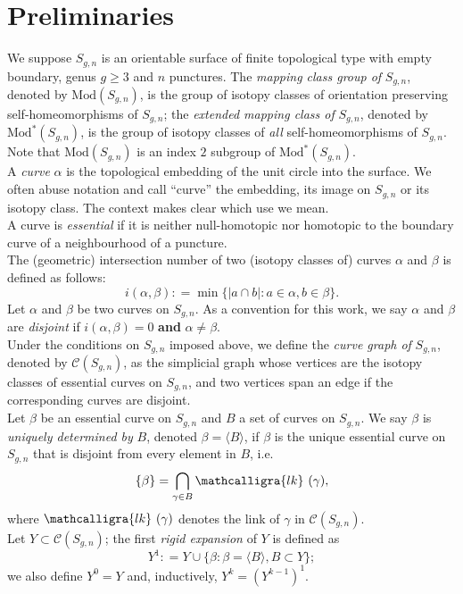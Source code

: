 \documentclass[twoside,11pt,a4paper]{article}
\newcommand*{\ccomp}[1]{\mathcal{C}(#1)}
\newcommand*{\Mod}[1]{\mathrm{Mod}(#1)}
\newcommand*{\EMod}[1]{\mathrm{Mod}^{*}(#1)}
\newcommand*{\lk}[1]{\mathcalligra{lk} \hspace{0.12cm}(#1)}
\newcommand*{\ColonEqq}{\mathrel{\mathop:}=}
\begin{document}
\section{Preliminaries}\label{prelim}
\indent We suppose $S_{g,n}$ is an orientable surface of finite topological type with empty boundary, genus $g \geq 3$ and $n$ punctures. The \textit{mapping class group of} $S_{g,n}$, denoted by $\Mod{S_{g,n}}$, is the group of isotopy classes of orientation preserving self-homeomorphisms of $S_{g,n}$; the \textit{extended mapping class of} $S_{g,n}$, denoted by $\EMod{S_{g,n}}$, is the group of isotopy classes of \textit{all} self-homeomorphisms of $S_{g,n}$. Note that $\Mod{S_{g,n}}$ is an index $2$ subgroup of $\EMod{S_{g,n}}$.\\
\indent A \textit{curve} $\alpha$ is the topological embedding of the unit circle into the surface. We often abuse notation and call ``curve'' the embedding, its image on $S_{g,n}$ or its isotopy class. The context makes clear which use we mean.\\
\indent A curve is \textit{essential} if it is neither null-homotopic nor homotopic to the boundary curve of a neighbourhood of a puncture.\\
\indent The (geometric) intersection number of two (isotopy classes of) curves $\alpha$ and $\beta$ is defined as follows: $$i(\alpha,\beta) \ColonEqq \min \{|a \cap b| : a \in \alpha, b \in \beta\}.$$
\indent Let $\alpha$ and $\beta$ be two curves on $S_{g,n}$. As a convention for this work, we say $\alpha$ and $\beta$ are \textit{disjoint} if $i(\alpha,\beta) = 0$ \textbf{and} $\alpha \neq \beta$.\\
\indent Under the conditions on $S_{g,n}$ imposed above, we define the \textit{curve graph of} $S_{g,n}$, denoted by $\ccomp{S_{g,n}}$, as the simplicial graph whose vertices are the isotopy classes of essential curves on $S_{g,n}$, and two vertices span an edge if the corresponding curves are disjoint.\\
\indent Let $\beta$ be an essential curve on $S_{g,n}$ and $B$ a set of curves on $S_{g,n}$. We say $\beta$ is \textit{uniquely determined by} $B$, denoted $\beta = \langle B \rangle$, if $\beta$ is the unique essential curve on $S_{g,n}$ that is disjoint from every element in $B$, i.e. $$\{\beta\} = \bigcap_{\gamma \in B} \lk{\gamma},$$ where $\lk{\gamma}$ denotes the link of $\gamma$ in $\ccomp{S_{g,n}}$.\\
\indent Let $Y \subset \ccomp{S_{g,n}}$; the first \textit{rigid expansion} of $Y$ is defined as $$Y^{1} \ColonEqq Y \cup \{\beta: \beta = \langle B \rangle, B \subset Y\};$$ we also define $Y^{0} = Y$ and, inductively, $Y^{k} = (Y^{k-1})^{1}$.\\
\end{document}
